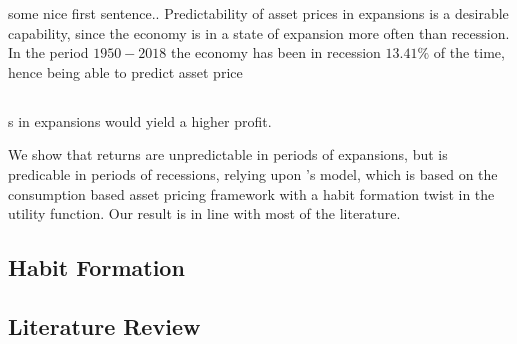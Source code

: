some nice first sentence..
Predictability of asset prices in expansions is a desirable capability, since the economy is in a state of expansion more often than recession. In the period $1950-2018$ the economy has been in recession $13.41\%$ of the time, hence being able to predict asset price\subsection{}s in expansions would yield a higher profit.

We show that returns are unpredictable in periods of expansions, but is predicable in periods of recessions, relying upon \cite{Campbell1999}'s model, which is based on the consumption based asset pricing framework with a habit formation twist in the utility function. Our result is in line with most of the literature. 

\subsection{Habit Formation} 

\subsection{Literature Review}


